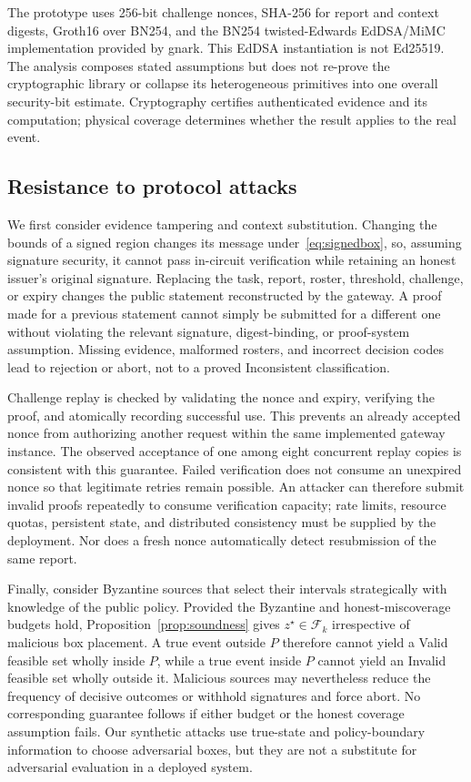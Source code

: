The prototype uses 256-bit challenge nonces, SHA-256 for report and context digests, Groth16 over BN254, and the BN254 twisted-Edwards EdDSA/MiMC implementation provided by gnark. This EdDSA instantiation is not Ed25519. The analysis composes stated assumptions but does not re-prove the cryptographic library or collapse its heterogeneous primitives into one overall security-bit estimate. Cryptography certifies authenticated evidence and its computation; physical coverage determines whether the result applies to the real event.

\subsection{Resistance to protocol attacks}
We first consider evidence tampering and context substitution. Changing the bounds of a signed region changes its message under~\eqref{eq:signedbox}, so, assuming signature security, it cannot pass in-circuit verification while retaining an honest issuer's original signature. Replacing the task, report, roster, threshold, challenge, or expiry changes the public statement reconstructed by the gateway. A proof made for a previous statement cannot simply be submitted for a different one without violating the relevant signature, digest-binding, or proof-system assumption. Missing evidence, malformed rosters, and incorrect decision codes lead to rejection or abort, not to a proved Inconsistent classification.

Challenge replay is checked by validating the nonce and expiry, verifying the proof, and atomically recording successful use. This prevents an already accepted nonce from authorizing another request within the same implemented gateway instance. The observed acceptance of one among eight concurrent replay copies is consistent with this guarantee. Failed verification does not consume an unexpired nonce so that legitimate retries remain possible. An attacker can therefore submit invalid proofs repeatedly to consume verification capacity; rate limits, resource quotas, persistent state, and distributed consistency must be supplied by the deployment. Nor does a fresh nonce automatically detect resubmission of the same report.

Finally, consider Byzantine sources that select their intervals strategically with knowledge of the public policy. Provided the Byzantine and honest-miscoverage budgets hold, Proposition~\ref{prop:soundness} gives $z^\star\in\mathcal F_k$ irrespective of malicious box placement. A true event outside $P$ therefore cannot yield a Valid feasible set wholly inside $P$, while a true event inside $P$ cannot yield an Invalid feasible set wholly outside it. Malicious sources may nevertheless reduce the frequency of decisive outcomes or withhold signatures and force abort. No corresponding guarantee follows if either budget or the honest coverage assumption fails. Our synthetic attacks use true-state and policy-boundary information to choose adversarial boxes, but they are not a substitute for adversarial evaluation in a deployed system.

